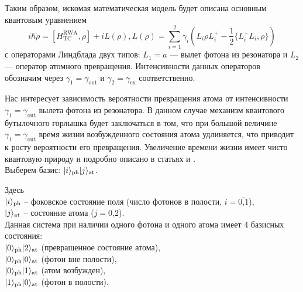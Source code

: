Таким образом, искомая математическая модель будет описана основным квантовым уравнением \cite{breuer}
\begin{equation}\label{sec2_master_eq}
	i\hbar\dot\rho = [H_{\text{TC}}^{\text{RWA}}, \rho] + iL(\rho), L(\rho) = \sum_{i=1}^{2}\gamma_{i}(L_{i}\rho L_{i}^{+} - \frac{1}{2}\{L_{i}^{+}L_{i}, \rho\})
\end{equation}
с операторами Линдблада двух типов: $L_{1} = a$ --- вылет фотона из резонатора \cite{breuer,photon_emission} и $L_{2}$ --- оператор атомного превращения. Интенсивности данных операторов обозначим через $\gamma_{1} = \gamma_{\text{out}}$ и $\gamma_{2} = \gamma_{\text{ex}}$ соответственно.

Нас интересует зависимость вероятности превращения атома от интенсивности $\gamma_{1} = \gamma_{\text{out}}$ вылета фотона из резонатора. В данном случае механизм квантового бутылочного горлышка будет заключаться в том, что при большой величине $\gamma_{1} = \gamma_{\text{out}}$ время жизни возбужденного состояния атома удлиняется, что приводит к росту вероятности его превращения. Увеличение времени жизни имеет чисто квантовую природу и подробно описано в статьях \cite{victorova} и \cite{kulagin_homogeneous}.
\\[18pt]
\noindent Выберем базис: $|i\rangle_{\text{ph}}|j\rangle_{\text{at}}$.

\noindent Здесь\\
\indent\qquad $|i\rangle_{\text{ph}}$ -- фоковское состояние поля (число фотонов в полости, $i=\overline{\mbox{0,1}}$),\\
\indent\qquad $|j\rangle_{\text{at}}$ -- состояние атома ($j=\overline{\mbox{0,2}}$).
\\[18pt]
\noindent Данная система при наличии одного фотона и одного атома имеет 4 базисных состояния:\\
\indent\qquad $|0\rangle_{\text{\text{ph}}}|2\rangle_{\text{\text{at}}}$ (превращенное состояние атома),\\
\indent\qquad $|0\rangle_{\text{\text{ph}}}|0\rangle_{\text{\text{at}}}$ (фотон вне полости),\\
\indent\qquad $|0\rangle_{\text{\text{ph}}}|1\rangle_{\text{\text{at}}}$ (атом возбужден),\\
\indent\qquad $|1\rangle_{\text{\text{ph}}}|0\rangle_{\text{\text{at}}}$ (фотон в полости).
\\[18pt]

